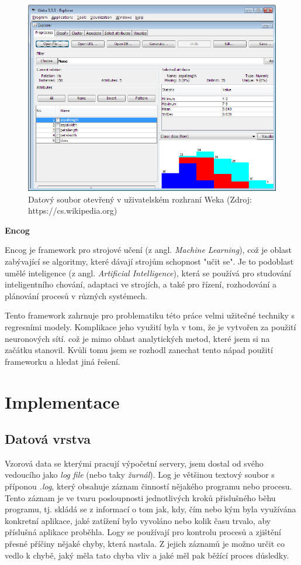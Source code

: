 \documentclass[a4paper,12pt,twoside]{scrreprt}
\begin{document}
\begin{figure}[h]
  \centering
  \includegraphics[width=15cm]{pictures/weka.png}
  \caption{Datový soubor otevřený v uživatelském rozhraní Weka \newline(Zdroj: https://cs.wikipedia.org)}
  \label{fig:weka}
\end{figure}

\newpage
\textbf{Encog}

Encog je framework pro strojové učení (z angl. \textit{Machine Learning}), což je oblast zabývající se algoritmy, které dávají strojům schopnost "učit se". Je to podoblast umělé inteligence (z angl. \textit{Artificial Intelligence}), která se používá pro studování inteligentního chování, adaptaci ve strojích, a také pro řízení, rozhodování a plánování procesů v různých systémech.

Tento framework zahrnuje pro problematiku této práce velmi užitečné techniky s regresními modely. Komplikace jeho využití byla v tom, že je vytvořen za použití neuronových sítí. což je mimo oblast analytických metod, které jsem si na začátku stanovil. Kvůli tomu jsem se rozhodl zanechat tento nápad použití frameworku a hledat jiná řešení. 

\newpage
\section{Implementace}
\subsection{Datová vrstva}
Vzorová data se kterými pracují výpočetní servery, jsem dostal od svého vedoucího jako \textit{log file} (nebo taky \textit{žurnál}). Log je většinou textový soubor s příponou \textit{.log}, který obsahuje záznam činností nějakého programu nebo procesu. Tento záznam je ve tvaru posloupnosti jednotlivých kroků přislušného běhu programu, tj. skládá se z informací o tom jak, kdy, čím nebo kým byla využívána konkretní aplikace, jaké zatížení bylo vyvoláno nebo kolik času trvalo, aby příslušná aplikace proběhla. Logy se používají pro kontrolu procesů a zjištění přesné příčiny nějaké chyby, která nastala. Z jejich záznamů je možno určit co vedlo k chybě, jaký měla tato chyba vliv a jaké měl pak běžící proces důsledky. 
\end{document}
